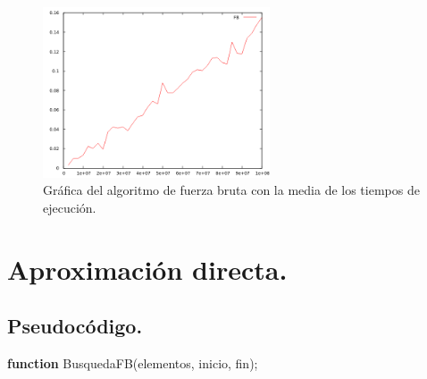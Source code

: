 \documentclass[11pt,a4paper]{article}
\begin{document}
			\begin{figure}[h]

				\centering
				\includegraphics[width=0.6\textwidth]{FB.png}
				\caption{Gráfica del algoritmo de fuerza bruta con la media de los tiempos de ejecución.}

			\end{figure}


\newpage

	\section{Aproximación directa.}

		\subsection{Pseudocódigo.}

			\vspace{0.5cm}

			\begin{algorithm}[H]

				\textbf{function} BusquedaFB(elementos, inicio, fin);


			\end{algorithm}
\end{document}
